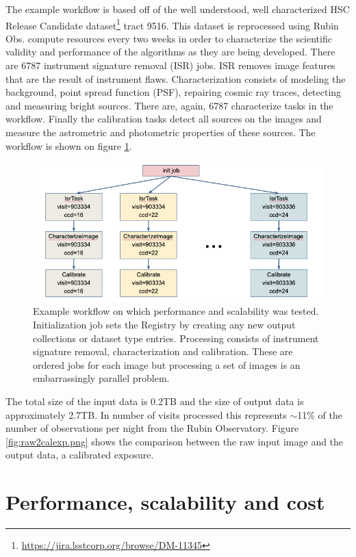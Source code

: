\documentclass[a4paper, 10pt, conference]{ieeeconf}
\begin{document}
The example workflow is based off of the well understood, well characterized HSC Release Candidate dataset\footnote{\url{https://jira.lsstcorp.org/browse/DM-11345}} tract 9516. This dataset is reprocessed using Rubin Obs. compute resources every two weeks in order to characterize the scientific validity and performance of the algorithms as they are being developed. There are 6787 instrument signature removal (ISR) jobs. ISR removes image features that are the result of instrument flaws. Characterization consists of modeling the background, point spread function (PSF), repairing cosmic ray traces, detecting and measuring bright sources.
There are, again, 6787 characterize tasks in the workflow. Finally the calibration tasks detect all sources on the images and measure the astrometric and photometric properties of these sources. The workflow is shown on figure \ref{fig:demo-workflow}.

\begin{figure}[htb]
\centering
\includegraphics[width=\columnwidth]{figures/demo-workflow.png}
\caption{Example workflow on which performance and scalability was tested. Initialization job sets the Registry by creating any new output collections or dataset type entries. Processing consists of instrument signature removal, characterization and calibration. These are ordered jobs for each image but processing a set of images is an embarrassingly parallel problem.}
\label{fig:demo-workflow}
\end{figure}

The total size of the input data is 0.2TB and the size of output data is approximately 2.7TB. In number of visits processed this represents $\sim$11\% of the number of observations per night from the Rubin Observatory. Figure \ref{fig:raw2calexp.png} shows the comparison between the raw input image and the output data, a calibrated exposure.


\section{Performance, scalability and cost}
\end{document}
